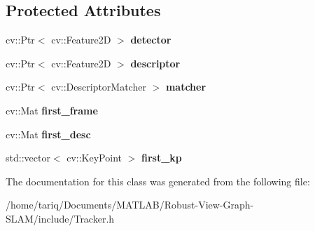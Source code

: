 \subsection*{Protected Attributes}
\begin{DoxyCompactItemize}
\item 
cv\+::\+Ptr$<$ cv\+::\+Feature2D $>$ {\bfseries detector}\hypertarget{classTracker_a113e6b249cad50aa133c744c87556449}{}\label{classTracker_a113e6b249cad50aa133c744c87556449}

\item 
cv\+::\+Ptr$<$ cv\+::\+Feature2D $>$ {\bfseries descriptor}\hypertarget{classTracker_ab1f0c7953ddebb90aff970c6ad1ec92c}{}\label{classTracker_ab1f0c7953ddebb90aff970c6ad1ec92c}

\item 
cv\+::\+Ptr$<$ cv\+::\+Descriptor\+Matcher $>$ {\bfseries matcher}\hypertarget{classTracker_ad7936ce125eaa9be7309144dc8dc4860}{}\label{classTracker_ad7936ce125eaa9be7309144dc8dc4860}

\item 
cv\+::\+Mat {\bfseries first\+\_\+frame}\hypertarget{classTracker_abb18df33a2dbc0dd706dccb9c76c4d02}{}\label{classTracker_abb18df33a2dbc0dd706dccb9c76c4d02}

\item 
cv\+::\+Mat {\bfseries first\+\_\+desc}\hypertarget{classTracker_acf42a4e56fb465e614e84d077ae353db}{}\label{classTracker_acf42a4e56fb465e614e84d077ae353db}

\item 
std\+::vector$<$ cv\+::\+Key\+Point $>$ {\bfseries first\+\_\+kp}\hypertarget{classTracker_ad31072f131ec915818bf43d5837f012b}{}\label{classTracker_ad31072f131ec915818bf43d5837f012b}

\end{DoxyCompactItemize}


The documentation for this class was generated from the following file\+:\begin{DoxyCompactItemize}
\item 
/home/tariq/\+Documents/\+M\+A\+T\+L\+A\+B/\+Robust-\/\+View-\/\+Graph-\/\+S\+L\+A\+M/include/Tracker.\+h\end{DoxyCompactItemize}
